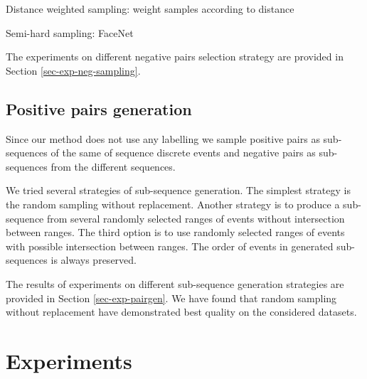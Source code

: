 \documentclass[sigconf]{acmart}
\begin{document}
Distance weighted sampling: weight samples according to distance 

Semi-hard sampling: FaceNet\cite{Schroff2015FaceNetAU}

The experiments on different negative pairs selection strategy are provided in Section \ref{sec-exp-neg-sampling}.

\subsection{Positive pairs generation} \label{sec-pos-pairs}

Since our method does not use any labelling we sample positive pairs as sub-sequences of the same of sequence discrete events and negative pairs as sub-sequences from the different sequences.

We tried several strategies of sub-sequence generation. The simplest strategy is the random sampling without replacement. Another strategy is to produce a sub-sequence from several randomly selected ranges of events without intersection between ranges. The third option is to use randomly selected ranges of events with possible intersection between ranges. 
The order of events in generated sub-sequences is always preserved.

The results of experiments on different sub-sequence generation strategies are provided in Section \ref{sec-exp-pairgen}. We have found that random sampling without replacement have demonstrated best quality on the considered datasets.

\section{Experiments} \label{sec-exp}
\end{document}
